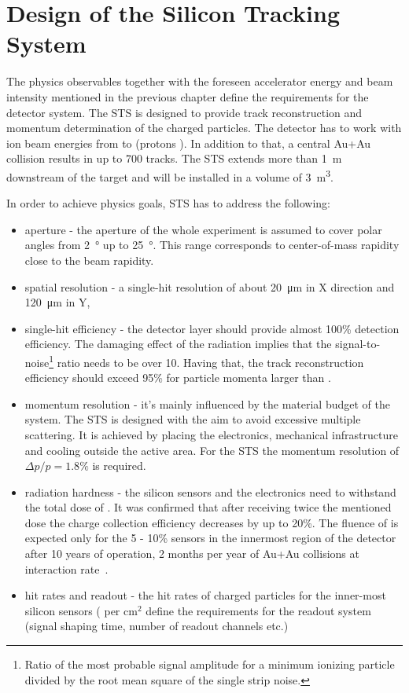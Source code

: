 \section{Design of the Silicon Tracking System}
\label{STS}

The physics observables together with the foreseen accelerator energy and beam intensity mentioned in the previous chapter define the requirements for the detector system. The \gls{STS} is designed to provide track reconstruction and momentum determination of the charged particles. The detector has to work with ion beam energies from  to  (protons ). In addition to that, a central Au+Au collision results in up to 700 tracks. The \gls{STS} extends more than \SI{1}{\metre} downstream of the target and will be installed in a volume of \SI{3}{\cubic\metre}. 

In order to achieve physics goals, \gls{STS} has to address the following:
\begin{itemize}
    \item  aperture - the aperture of the whole experiment is assumed to cover polar angles from \SI{2}{\degree} up to \SI{25}{\degree}. This range corresponds to center-of-mass rapidity close to the beam rapidity. 
    \item spatial resolution - a single-hit resolution of about \SI{20}{\micro\metre} in X direction and \SI{120}{\micro\metre} in Y, 
    \item single-hit efficiency - the detector layer should provide almost 100\% detection efficiency. The damaging effect of the radiation implies that the signal-to-noise\footnote{Ratio of the most probable signal amplitude for a minimum ionizing particle divided by the root mean square of the single strip noise.} ratio needs to be over 10. Having that, the track reconstruction efficiency should exceed 95\% for particle momenta larger than . 
    \item momentum resolution - it's mainly influenced by the material budget of the system. The \gls{STS} is designed with the aim to avoid excessive multiple scattering. It is achieved by placing the electronics, mechanical infrastructure and cooling outside the active area. For the \gls{STS} the momentum resolution of $\Delta p/p = 1.8\%$ is required. 
    \item radiation hardness - the silicon sensors and the electronics need to withstand the total dose of . It was confirmed that after receiving twice the mentioned dose the charge collection efficiency decreases by up to 20\%. The fluence of  is expected only for the 5 - 10\% sensors in the innermost region of the detector after 10 years of operation, 2 months per year of  Au+Au collisions at  interaction rate~\cite{Heuser:54798}.
    \item hit rates and readout - the hit rates of charged particles for the inner-most silicon sensors ( per $\mathrm{cm^{2}}$ define the requirements for the readout system (signal shaping time, number of readout channels etc.)
\end{itemize}


